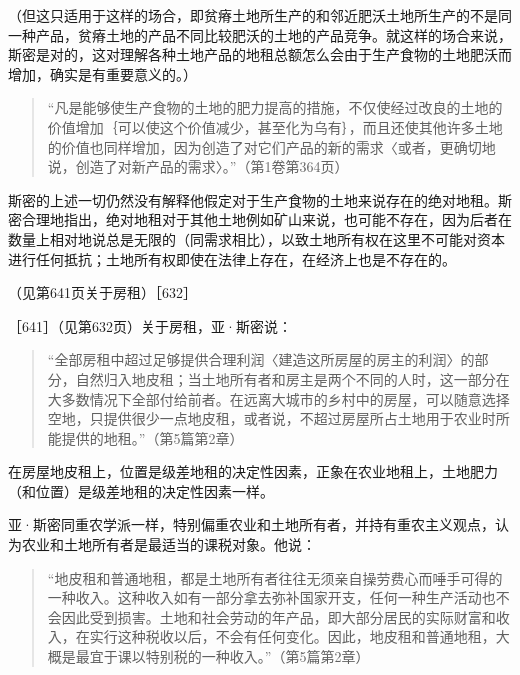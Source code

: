 （但这只适用于这样的场合，即贫瘠土地所生产的和邻近肥沃土地所生产的不是同一种产品，贫瘠土地的产品不同比较肥沃的土地的产品竞争。就这样的场合来说，斯密是对的，这对理解各种土地产品的地租总额怎么会由于生产食物的土地肥沃而增加，确实是有重要意义的。）

\begin{quote}{“凡是能够使生产食物的土地的肥力提高的措施，不仅使经过改良的土地的价值增加｛可以使这个价值减少，甚至化为乌有｝，而且还使其他许多土地的价值也同样增加，因为创造了对它们产品的新的需求〈或者，更确切地说，创造了对新产品的需求〉。”（第1卷第364页）}\end{quote}

斯密的上述一切仍然没有解释他假定对于生产食物的土地来说存在的绝对地租。斯密合理地指出，绝对地租对于其他土地例如矿山来说，也可能不存在，因为后者在数量上相对地说总是无限的（同需求相比），以致土地所有权在这里不可能对资本进行任何抵抗；土地所有权即使在法律上存在，在经济上也是不存在的。

（见第641页关于房租）［632］


［641］（见第632页）关于房租，亚·斯密说：

\begin{quote}{“全部房租中超过足够提供合理利润〈建造这所房屋的房主的利润〉的部分，自然归入地皮租；当土地所有者和房主是两个不同的人时，这一部分在大多数情况下全部付给前者。在远离大城市的乡村中的房屋，可以随意选择空地，只提供很少一点地皮租，或者说，不超过房屋所占土地用于农业时所能提供的地租。”（第5篇第2章）}\end{quote}

在房屋地皮租上，位置是级差地租的决定性因素，正象在农业地租上，土地肥力（和位置）是级差地租的决定性因素一样。

亚·斯密同重农学派一样，特别偏重农业和土地所有者，并持有重农主义观点，认为农业和土地所有者是最适当的课税对象。他说：

\begin{quote}{“地皮租和普通地租，都是土地所有者往往无须亲自操劳费心而唾手可得的一种收入。这种收入如有一部分拿去弥补国家开支，任何一种生产活动也不会因此受到损害。土地和社会劳动的年产品，即大部分居民的实际财富和收入，在实行这种税收以后，不会有任何变化。因此，地皮租和普通地租，大概是最宜于课以特别税的一种收入。”（第5篇第2章）}\end{quote}

